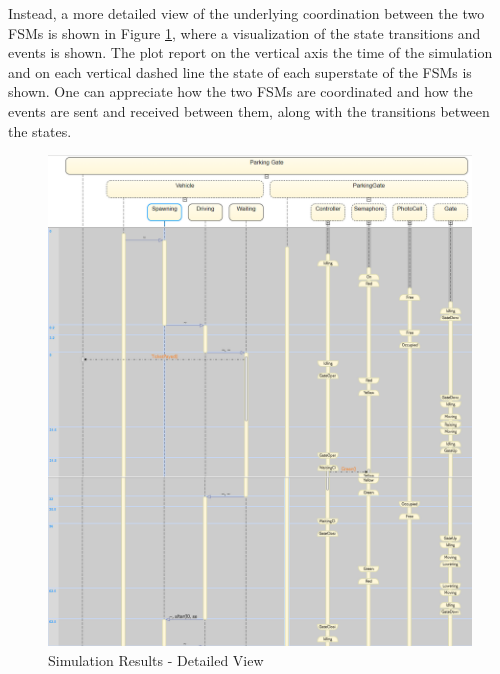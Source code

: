 Instead, a more detailed view of the underlying coordination between the two FSMs is shown in Figure \ref{fig:simulation_results_detailed}, where a visualization of the state transitions and events is shown.
The plot report on the vertical axis the time of the simulation and on each vertical dashed line the state of each superstate of the FSMs is shown.
One can appreciate how the two FSMs are coordinated and how the events are sent and received between them, along with the transitions between the states.

\begin{figure}[H]
    \centering
    \includegraphics[width=1.0\textwidth]{./img/events.png}
    \caption{Simulation Results - Detailed View}
    \label{fig:simulation_results_detailed}
\end{figure}










